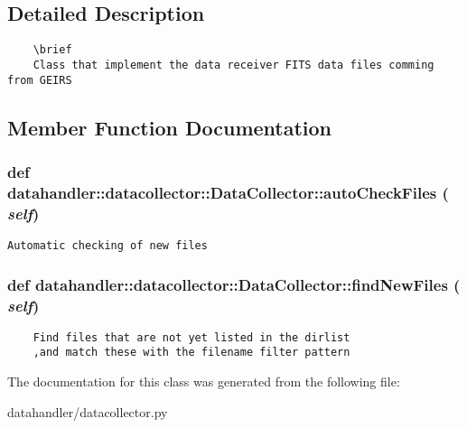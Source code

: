 \subsection{Detailed Description}


\footnotesize\begin{verbatim}
    \brief
    Class that implement the data receiver FITS data files comming from GEIRS  
\end{verbatim}
\normalsize
 



\subsection{Member Function Documentation}
\subsubsection{\setlength{\rightskip}{0pt plus 5cm}def datahandler::datacollector::Data\-Collector::auto\-Check\-Files ( {\em self})}\label{classdatahandler_1_1datacollector_1_1DataCollector_15b22d339a2d5a61b219bc310fae5979}




\footnotesize\begin{verbatim}
Automatic checking of new files
\end{verbatim}
\normalsize
\subsubsection{\setlength{\rightskip}{0pt plus 5cm}def datahandler::datacollector::Data\-Collector::find\-New\-Files ( {\em self})}\label{classdatahandler_1_1datacollector_1_1DataCollector_26de01b66efc8033908196509faa2fee}




\footnotesize\begin{verbatim}
    Find files that are not yet listed in the dirlist
    ,and match these with the filename filter pattern
\end{verbatim}
\normalsize
 

The documentation for this class was generated from the following file:\begin{CompactItemize}
\item 
datahandler/datacollector.py\end{CompactItemize}
